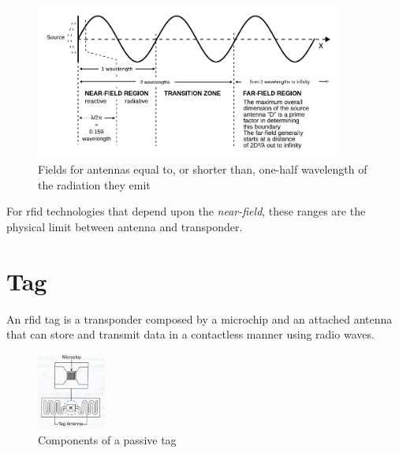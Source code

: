 \begin{figure}[!ht]
    \centering
    \includegraphics[width=0.9\textwidth]{./figs/02-state-of-the-art/Field_regions_for_typical_antennas_vector.pdf}
    \caption{Fields for antennas equal to, or shorter than, one-half wavelength of the radiation they emit~\cite{SafetyHealthTopics}} 
    \label{fig:fieldregionsshortantenna}
\end{figure}



For \ac{rfid} technologies that depend upon the \emph{near-field}, these ranges are the physical limit between antenna and transponder.


\section{Tag}

An \ac{rfid} tag is a transponder composed by a microchip and an attached antenna that can store and transmit data in a contactless manner using radio waves.


\begin{figure}[!ht]
    \centering
    \includegraphics[width=0.2\textwidth]{./figs/02-state-of-the-art/tag.jpg}
    \caption{Components of a passive tag~\cite{lahiriRFIDSourcebook2005}} 
    \label{fig:passivetag}
\end{figure}

